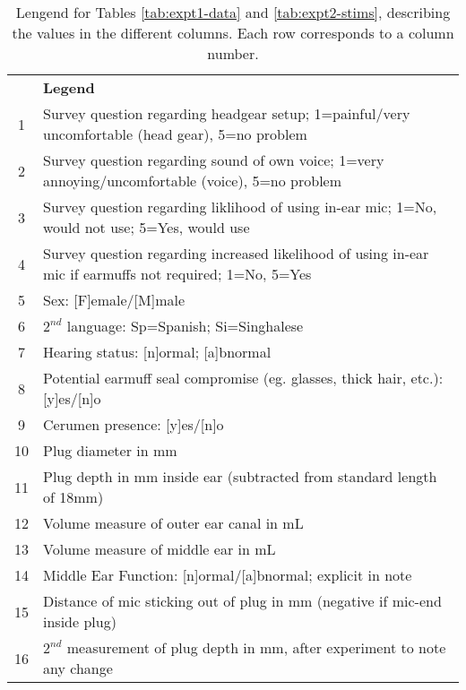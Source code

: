\begin{table}
\begin{tabular}{c|p{13cm}}
  & \textbf{Legend} \\
1 & Survey question regarding headgear setup; 1=painful/very uncomfortable (head gear), 5=no problem \\
2 & Survey question regarding sound of own voice; 1=very annoying/uncomfortable (voice), 5=no problem \\
3 & Survey question regarding liklihood of using in-ear mic; 1=No, would not use; 5=Yes, would use \\
4 & Survey question regarding increased likelihood of using in-ear mic if earmuffs not required; 1=No, 5=Yes \\
5 & Sex: [F]emale/[M]male \\
6 & $2^{nd}$ language: Sp=Spanish; Si=Singhalese \\
7 & Hearing status: [n]ormal; [a]bnormal\\
8 & Potential earmuff seal compromise (eg. glasses, thick hair, etc.): [y]es/[n]o  \\
9 & Cerumen presence: [y]es/[n]o \\
10 & Plug diameter in mm \\
11 & Plug depth in mm inside ear (subtracted from standard length of 18mm)\\
12 & Volume measure of outer ear canal in mL \\
13 & Volume measure of middle ear in mL \\
14 & Middle Ear Function: [n]ormal/[a]bnormal; explicit in note \\
15 & Distance of mic sticking out of plug in mm (negative if mic-end inside plug) \\
16 & $2^{nd}$ measurement of plug depth in mm, after experiment to note any change \\
\end{tabular}
\caption{Lengend for Tables \ref{tab:expt1-data} and \ref{tab:expt2-stims}, describing the values in the different columns.  Each row corresponds to a column number.}\label{appAlegend}
\end{table}


